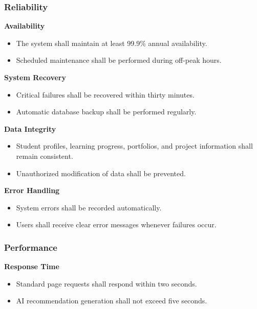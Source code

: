\subsubsection{Reliability}

\textbf{Availability}

\begin{itemize}
    \item The system shall maintain at least 99.9\% annual availability.
    \item Scheduled maintenance shall be performed during off-peak hours.
\end{itemize}

\textbf{System Recovery}

\begin{itemize}
    \item Critical failures shall be recovered within thirty minutes.
    \item Automatic database backup shall be performed regularly.
\end{itemize}

\textbf{Data Integrity}

\begin{itemize}
    \item Student profiles, learning progress, portfolios, and project information shall remain consistent.
    \item Unauthorized modification of data shall be prevented.
\end{itemize}

\textbf{Error Handling}

\begin{itemize}
    \item System errors shall be recorded automatically.
    \item Users shall receive clear error messages whenever failures occur.
\end{itemize}

\subsubsection{Performance}

\textbf{Response Time}

\begin{itemize}
    \item Standard page requests shall respond within two seconds.
    \item AI recommendation generation shall not exceed five seconds.
\end{itemize}

